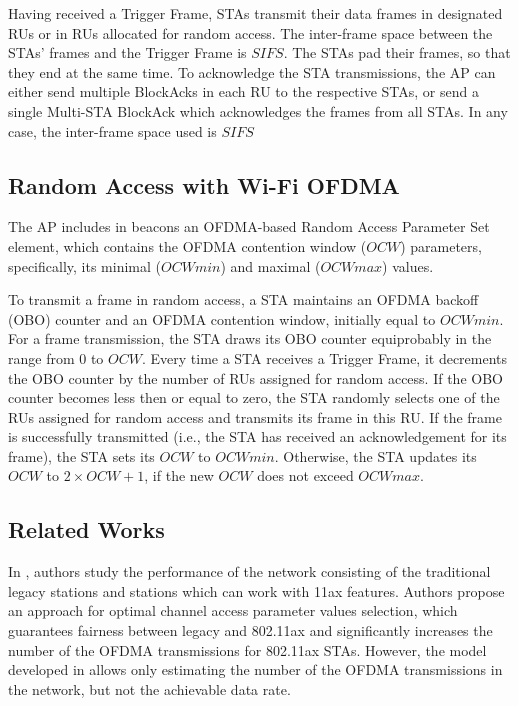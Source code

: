 Having received a Trigger Frame, STAs transmit their data frames in designated RUs or in RUs allocated for random access.
The inter-frame space between the STAs' frames and the Trigger Frame is $SIFS$.
The STAs pad their frames, so that they end at the same time.
To acknowledge the STA transmissions, the AP can either send multiple BlockAcks in each RU to the respective STAs, or send a single Multi-STA BlockAck which acknowledges the frames from all STAs.
In any case, the inter-frame space used is $SIFS$




\subsection{Random Access with Wi-Fi OFDMA}
The AP includes in beacons an OFDMA-based Random Access Parameter Set element, which contains the OFDMA contention window ($OCW$) parameters, specifically, its minimal ($OCWmin$) and maximal ($OCWmax$) values.

To transmit a frame in random access, a STA maintains an OFDMA backoff (OBO) counter and an OFDMA contention window, initially equal to $OCWmin$.
For a frame transmission, the STA draws its OBO counter equiprobably in the range from $0$ to $OCW$.
Every time a STA receives a Trigger Frame, it decrements the OBO counter by the number of RUs assigned for random access.
If the OBO counter becomes less then or equal to zero, the STA randomly selects one of the RUs assigned for random access and transmits its frame in this RU.
If the frame is successfully transmitted (i.e., the STA has received an acknowledgement for its frame), the STA sets its $OCW$ to $OCWmin$.
Otherwise, the STA updates its $OCW$ to $2 \times OCW + 1$, if the new $OCW$ does not exceed $OCWmax$.


\subsection{Related Works}

In \cite{khorov2016several}, authors study the performance of the network consisting of the traditional legacy stations and stations which can work with 11ax features.
Authors propose an approach for optimal channel access parameter values selection, which guarantees fairness between legacy and 802.11ax and significantly increases the number of the OFDMA transmissions for 802.11ax STAs.
However, the model developed in \cite{khorov2016several} allows only estimating the number of the OFDMA transmissions in the network, but not the achievable data rate. 

